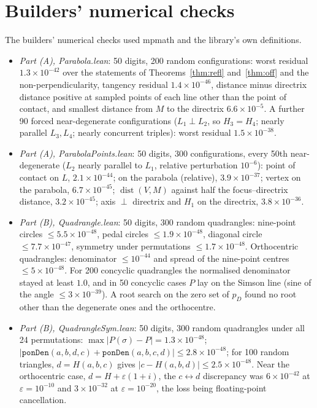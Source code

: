 \documentclass[11pt]{article}
\theoremstyle{definition}
\theoremstyle{remark}
\newcommand{\lean}[1]{\texttt{#1}}
\begin{document}
\appendix
\section{Builders' numerical checks}\label{app:numerics}
The builders' numerical checks used mpmath and the library's own definitions.
\begin{itemize}
\item \emph{Part (A), Parabola.lean}: 50 digits, 200 random configurations: worst residual
$1.3\times10^{-42}$ over the statements of Theorems~\ref{thm:refl} and~\ref{thm:off} and the
non-perpendicularity, tangency residual $1.4\times10^{-46}$, distance minus directrix distance positive
at sampled points of each line other than the point of contact, and smallest distance from $M$ to the
directrix $6.6\times10^{-5}$. A further 90 forced near-degenerate configurations ($L_1\perp L_2$, so
$H_3=H_4$; nearly parallel $L_3,L_4$; nearly concurrent triples): worst residual $1.5\times10^{-38}$.
\item \emph{Part (A), ParabolaPoints.lean}: 50 digits, 300 configurations, every 50th near-degenerate
($L_2$ nearly parallel to $L_1$, relative perturbation $10^{-6}$): point of contact on $L$,
$2.1\times10^{-44}$; on the parabola (relative), $3.9\times10^{-37}$; vertex on the parabola,
$6.7\times10^{-45}$; $\operatorname{dist}(V,M)$ against half the focus--directrix distance,
$3.2\times10^{-45}$; axis $\perp$ directrix and $H_1$ on the directrix, $3.8\times10^{-36}$.
\item \emph{Part (B), Quadrangle.lean}: 50 digits, 300 random quadrangles: nine-point circles
$\le5.5\times10^{-48}$, pedal circles $\le1.9\times10^{-48}$, diagonal circle $\le7.7\times10^{-47}$,
symmetry under permutations $\le1.7\times10^{-48}$. Orthocentric quadrangles: denominator
$\le10^{-44}$ and spread of the nine-point centres $\le5\times10^{-48}$. For 200 concyclic quadrangles
the normalised denominator stayed at least $1.0$, and in 50 concyclic cases $P$ lay on the Simson line
(sine of the angle $\le3\times10^{-39}$). A root search on the zero set of $p_D$ found no root other
than the degenerate ones and the orthocentre.
\item \emph{Part (B), QuadrangleSym.lean}: 50 digits, 300 random quadrangles under all 24 permutations:
$\max|P(\sigma)-P|=1.3\times10^{-48}$; $|\lean{ponDen}(a,b,d,c)+\lean{ponDen}(a,b,c,d)|\le2.8\times10^{-48}$;
for 100 random triangles, $d=H(a,b,c)$ gives $|c-H(a,b,d)|\le2.5\times10^{-48}$. Near the orthocentric
case, $d=H+\varepsilon(1+i)$, the $c\leftrightarrow d$ discrepancy was $6\times10^{-42}$ at
$\varepsilon=10^{-10}$ and $3\times10^{-32}$ at $\varepsilon=10^{-20}$, the loss being floating-point
cancellation.
\end{itemize}
\end{document}
